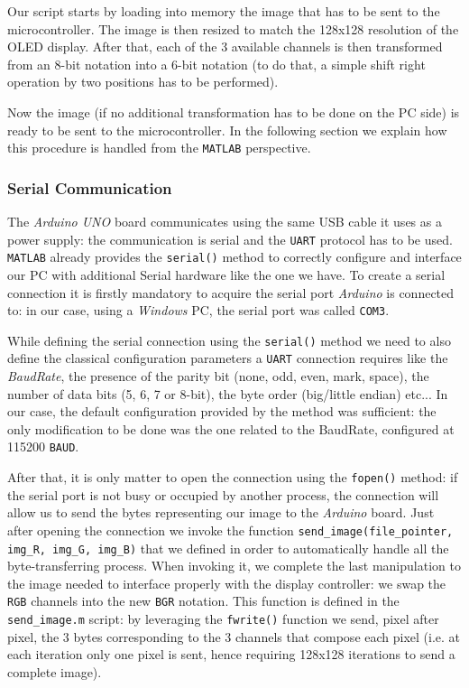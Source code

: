 \documentclass[a4paper]{article}
\begin{document}
            Our script starts by loading into memory the image that has to be sent to the microcontroller. The image is then resized to match the 128x128 resolution of the OLED display. After that, each of the 3 available channels is then transformed from an 8-bit notation into a 6-bit notation (to do that, a simple shift right operation by two positions has to be performed).

            Now the image (if no additional transformation has to be done on the PC side) is ready to be sent to the microcontroller. In the following section we explain how this procedure is handled from the \texttt{MATLAB} perspective.

        \subsubsection{Serial Communication}
            The \emph{Arduino UNO} board communicates using the same USB cable it uses as a power supply: the communication is serial and the \texttt{UART} protocol has to be used.
            \texttt{MATLAB} already provides the \texttt{serial()} method to correctly configure and interface our PC with additional Serial hardware like the one we have.
            To create a serial connection it is firstly mandatory to acquire the serial port \emph{Arduino} is connected to: in our case, using a \emph{Windows} PC, the serial port was called \texttt{COM3}.

            While defining the serial connection using the \texttt{serial()} method we need to also define the classical configuration parameters a \texttt{UART} connection requires like the \emph{BaudRate}, the presence of the parity bit (none, odd, even, mark, space), the number of data bits (5, 6, 7 or 8-bit), the byte order (big/little endian) etc... In our case, the default configuration provided by the method was sufficient: the only modification to be done was the one related to the BaudRate, configured at 115200 \texttt{BAUD}.

            After that, it is only matter to open the connection using the \texttt{fopen()} method: if the serial port is not busy or occupied by another process, the connection will allow us to send the bytes representing our image to the \emph{Arduino} board.
            Just after opening the connection we invoke the function \texttt{send\_image(file\_pointer, img\_R, img\_G, img\_B)} that we defined in order to automatically handle all the byte-transferring process.
            When invoking it, we complete the last manipulation to the image needed to interface properly with the display controller: we swap the \texttt{RGB} channels into the new \texttt{BGR} notation.
            This function is defined in the \texttt{send\_image.m} script: by leveraging the \texttt{fwrite()} function we send, pixel after pixel, the 3 bytes corresponding to the 3 channels that compose each pixel (i.e. at each iteration only one pixel is sent, hence requiring 128x128 iterations to send a complete image).
\end{document}
